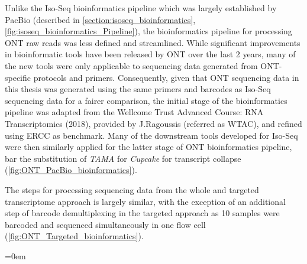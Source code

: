 Unlike the Iso-Seq bioinformatics pipeline which was largely established by PacBio (described in \cref{section:isoseq_bioinformatics}, \cref{fig:isoseq_bioinformatics_Pipeline}), the bioinformatics pipeline for processing ONT raw reads was less defined and streamlined. While significant improvements in bioinformatic tools have been released by ONT over the last 2 years, many of the new tools were only applicable to sequencing data generated from ONT-specific protocols and primers. Consequently, given that ONT sequencing data in this thesis was generated using the same primers and barcodes as Iso-Seq sequencing data for a fairer comparison, the initial stage of the bioinformatics pipeline was adapted from the Wellcome Trust Advanced Course: RNA Transcriptomics (2018), provided by J.Ragoussis (referred as WTAC), and refined using ERCC as benchmark. Many of the downstream tools developed for Iso-Seq were then similarly applied for the latter stage of ONT bioinformatics pipeline, bar the substitution of \textit{TAMA} for \textit{Cupcake} for transcript collapse (\cref{fig:ONT_PacBio_bioinformatics}). 

The steps for processing sequencing data from the whole and targeted transcriptome approach is largely similar, with the exception of an additional step of barcode demultiplexing in the targeted approach as 10 samples were barcoded and sequenced simultaneously in one flow cell (\cref{fig:ONT_Targeted_bioinformatics}). 

\begingroup
\parindent=0em
\localtableofcontents 
\endgroup

